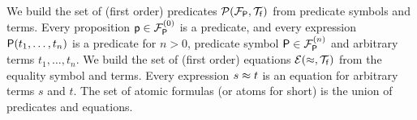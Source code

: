 
\begin{definition}\label{def:predicates}\label{def:equations}\label{def:atoms}
	We build the set of (first order) {\myem predicates} $\mcPT$
	from predicate symbols and terms. 
	Every proposition $\mpp\in \mcFPn[0]$ is a predicate, 
	and every expression $\mP(t_1,\ldots,t_n)$ is a predicate for $n>0$,
	predicate symbol $\mP\in\mcFPn$ and arbitrary terms $t_1,\ldots,t_n$.
%	
	We build the set of (first order) {\myem equations }$\mcET$ from the equality symbol and terms.
	Every expression $s\mEQ t$ is an equation %
	for arbitrary terms $s$ and $t$.
%	
	The set of atomic formulas (or {\myem atoms }for short) is the union of predicates and equations.
\end{definition}